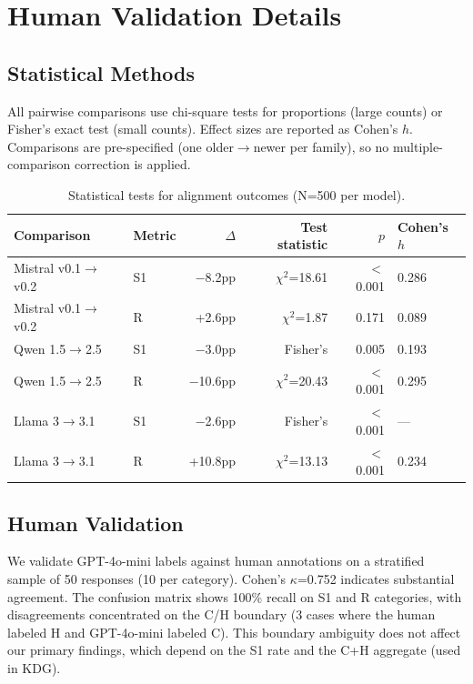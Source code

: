 \documentclass{article}
\begin{document}
\newpage
\appendix

\section{Human Validation Details}
\label{app:human_validation}

\subsection{Statistical Methods}
\label{app:stats}

All pairwise comparisons use chi-square tests for proportions (large counts) or Fisher's exact test (small counts). Effect sizes are reported as Cohen's $h$. Comparisons are pre-specified (one older$\to$newer per family), so no multiple-comparison correction is applied.

\begin{table}[htbp]
\centering
\caption{Statistical tests for alignment outcomes (N=500 per model).}
\small
\begin{tabular}{llrrrl}
\toprule
Comparison & Metric & $\Delta$ & Test statistic & $p$ & Cohen's $h$ \\
\midrule
Mistral v0.1$\to$v0.2 & S1 & $-$8.2pp & $\chi^2$=18.61 & $<$0.001 & 0.286 \\
Mistral v0.1$\to$v0.2 & R & +2.6pp & $\chi^2$=1.87 & 0.171 & 0.089 \\
Qwen 1.5$\to$2.5 & S1 & $-$3.0pp & Fisher's & 0.005 & 0.193 \\
Qwen 1.5$\to$2.5 & R & $-$10.6pp & $\chi^2$=20.43 & $<$0.001 & 0.295 \\
Llama 3$\to$3.1 & S1 & $-$2.6pp & Fisher's & $<$0.001 & --- \\
Llama 3$\to$3.1 & R & +10.8pp & $\chi^2$=13.13 & $<$0.001 & 0.234 \\
\bottomrule
\end{tabular}
\end{table}

\subsection{Human Validation}

We validate GPT-4o-mini labels against human annotations on a stratified sample of 50 responses (10 per category). Cohen's $\kappa$=0.752 indicates substantial agreement. The confusion matrix shows 100\% recall on S1 and R categories, with disagreements concentrated on the C/H boundary (3 cases where the human labeled H and GPT-4o-mini labeled C). This boundary ambiguity does not affect our primary findings, which depend on the S1 rate and the C+H aggregate (used in KDG).
\end{document}
